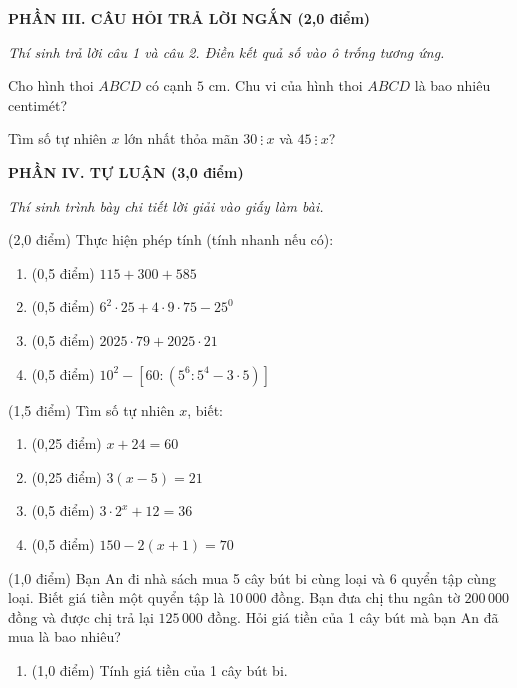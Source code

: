 \documentclass[12pt,a4paper]{article}
\begin{document}
\setcounter{ex}{0}
\noindent\textbf{\large PHẦN III. CÂU HỎI TRẢ LỜI NGẮN (2,0 điểm)}

\textit{Thí sinh trả lời câu 1 và câu 2. Điền kết quả số vào ô trống tương ứng.}

\vspace{1mm}
\begin{ex}
Cho hình thoi $ABCD$ có cạnh $5\text{ cm}$. Chu vi của hình thoi $ABCD$ là bao nhiêu centimét? 
\end{ex}

\begin{ex}
Tìm số tự nhiên $x$ lớn nhất thỏa mãn $30 \ \vdots \ x$ và $45 \ \vdots \ x$? 
\end{ex}


\setcounter{ex}{0}
\noindent\textbf{\large PHẦN IV. TỰ LUẬN (3,0 điểm)}

\textit{Thí sinh trình bày chi tiết lời giải vào giấy làm bài.}

\vspace{1mm}
\begin{ex} (2,0 điểm)
Thực hiện phép tính (tính nhanh nếu có):
\begin{enumerate}[label=\textbf{\alph*)}, leftmargin=0.8cm, itemsep=2pt]
\item (0,5 điểm) $115 + 300 + 585$
\item (0,5 điểm) $6^2 \cdot 25 + 4 \cdot 9 \cdot 75 - 25^0$
\item (0,5 điểm) $2025 \cdot 79 + 2025 \cdot 21$
\item (0,5 điểm) $10^2 - [60 : (5^6 : 5^4 - 3 \cdot 5)]$
\end{enumerate}
\end{ex}
\vspace{1.5mm}

\begin{ex} (1,5 điểm)
Tìm số tự nhiên $x$, biết:
\begin{enumerate}[label=\textbf{\alph*)}, leftmargin=0.8cm, itemsep=2pt]
\item (0,25 điểm) $x + 24 = 60$
\item (0,25 điểm) $3(x - 5) = 21$
\item (0,5 điểm) $3 \cdot 2^x + 12 = 36$
\item (0,5 điểm) $150 - 2(x + 1) = 70$
\end{enumerate}
\end{ex}
\vspace{1.5mm}

\begin{ex} (1,0 điểm)
Bạn An đi nhà sách mua 5 cây bút bi cùng loại và 6 quyển tập cùng loại. Biết giá tiền một quyển tập là $10\,000$ đồng. Bạn đưa chị thu ngân tờ $200\,000$ đồng và được chị trả lại $125\,000$ đồng. Hỏi giá tiền của 1 cây bút mà bạn An đã mua là bao nhiêu?
\begin{enumerate}[label=\textbf{\alph*)}, leftmargin=0.8cm, itemsep=2pt]
\item (1,0 điểm) Tính giá tiền của 1 cây bút bi.
\end{enumerate}
\end{ex}
\vspace{1.5mm}
\end{document}
